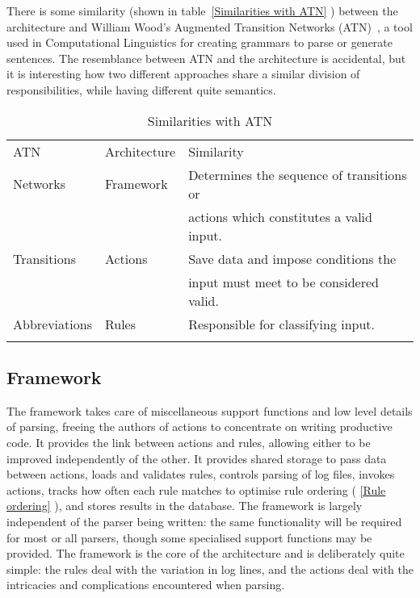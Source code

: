 \documentclass{svmult}
\newcommand{\tabletopline}[0]{%
    \hline%
    \noalign{\smallskip}%
}
\newcommand{\tablebottomline}[0]{%
    \noalign{\smallskip}%
    \hline%
}
\newcommand{\tablemiddleline}[0]{%
    \noalign{\smallskip}%
    \hline%
    \noalign{\smallskip}%
}
\newcommand{\sectionref}[1]{%
    \textsection{}\vref*{#1}%
}
\newcommand{\refwithlabel}[2]{%
    #1~\vref{#2}%
}
\newcommand{\tableref}[1]{%
    \refwithlabel{table}{#1}%
}
\begin{document}
There is some similarity (shown in \tableref{Similarities with ATN})
between the architecture and William Wood's Augmented Transition Networks
(ATN)~\cite{atns, nlpip}, a tool used in Computational Linguistics for
creating grammars to parse or generate sentences.  The resemblance between
ATN and the architecture is accidental, but it is interesting how two
different approaches share a similar division of responsibilities, while
having different quite semantics.


\begin{table}[hbtp]
    \caption{Similarities with ATN}\label{Similarities with ATN}
    \begin{tabular}[]{lll}
        \tabletopline{}%
        ATN           & Architecture    & Similarity                                \\
        \tablemiddleline{}%
        Networks      & Framework       & Determines the sequence of transitions or \\
                      &                 & actions which constitutes a valid input.  \\
        Transitions   & Actions         & Save data and impose conditions the       \\
                      &                 & input must meet to be considered valid.   \\
        Abbreviations & Rules           & Responsible for classifying input.        \\
        \tablebottomline{}%
    \end{tabular}
\end{table}

\subsection{Framework}

\label{Framework}

The framework takes care of miscellaneous support functions and low level
details of parsing, freeing the authors of actions to concentrate on
writing productive code.  It provides the link between actions and rules,
allowing either to be improved independently of the other.  It provides
shared storage to pass data between actions, loads and validates rules,
controls parsing of log files, invokes actions, tracks how often each rule
matches to optimise rule ordering (\sectionref{Rule ordering}), and stores
results in the database.  The framework is largely independent of the
parser being written: the same functionality will be required for most or
all parsers, though some specialised support functions may be provided.
The framework is the core of the architecture and is deliberately quite
simple: the rules deal with the variation in log lines, and the actions
deal with the intricacies and complications encountered when parsing.
\end{document}
